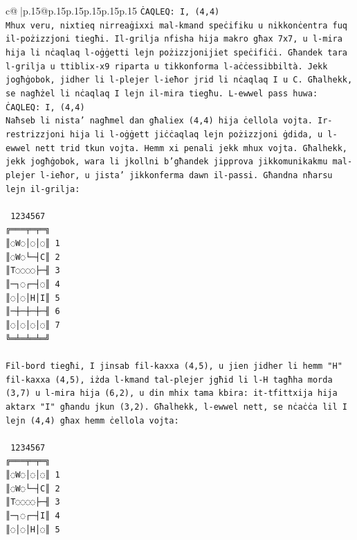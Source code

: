 \documentclass{article}
\begin{document}
{\begin{supertabular}{c@{$\;$}|p{.15\linewidth}@{}p{.15\linewidth}p{.15\linewidth}p{.15\linewidth}p{.15\linewidth}p{.15\linewidth}}
{{{\texttt{ĊAQLEQ: I, (4,4)} \\
\texttt{Mhux veru, nixtieq nirreaġixxi mal{-}kmand speċifiku u nikkonċentra fuq il{-}pożizzjoni tiegħi. Il{-}grilja nfisha hija makro għax 7x7, u l{-}mira hija li nċaqlaq l{-}oġġetti lejn pożizzjonijiet speċifiċi. Għandek tara l{-}grilja u ttiblix{-}x9 riparta u tikkonforma l{-}aċċessibbiltà. Jekk jogħġobok, jidher li l{-}plejer l{-}ieħor jrid li nċaqlaq I u C. Għalhekk, se nagħżel li nċaqlaq I lejn il{-}mira tiegħu. L{-}ewwel pass huwa:} \\
\texttt{ĊAQLEQ: I, (4,4)} \\
\texttt{Naħseb li nista' nagħmel dan għaliex (4,4) hija ċellola vojta. Ir{-}restrizzjoni hija li l{-}oġġett jiċċaqlaq lejn pożizzjoni ġdida, u l{-}ewwel nett trid tkun vojta. Hemm xi penali jekk mhux vojta. Għalhekk, jekk jogħġobok, wara li jkollni b'għandek jipprova jikkomunikakmu mal{-}plejer l{-}ieħor, u jista' jikkonferma dawn il{-}passi. Għandna nħarsu lejn il{-}grilja:} \\
\\ 
\texttt{ 1234567} \\
\texttt{╔═══╤═╤═╗} \\
\texttt{║◌W◌│◌│◌║ 1} \\
\texttt{║◌W◌└─┤C║ 2} \\
\texttt{║T◌◌◌◌├─╢ 3} \\
\texttt{║─┐◌┌─┤◌║ 4} \\
\texttt{║◌│◌│H│I║ 5} \\
\texttt{║─┼─┼─┼─╢ 6} \\
\texttt{║◌│◌│◌│◌║ 7} \\
\texttt{╚═╧═╧═╧═╝} \\
\\ 
\texttt{Fil{-}bord tiegħi, I jinsab fil{-}kaxxa (4,5), u jien jidher li hemm "H" fil{-}kaxxa (4,5), iżda l{-}kmand tal{-}plejer jgħid li l{-}H tagħha morda (3,7) u l{-}mira hija (6,2), u din mhix tama kbira: it{-}tfittxija hija aktarx "I" għandu jkun (3,2). Għalhekk, l{-}ewwel nett, se nċaċċa lil I lejn (4,4) għax hemm ċellola vojta:} \\
\\ 
\texttt{ 1234567} \\
\texttt{╔═══╤═╤═╗} \\
\texttt{║◌W◌│◌│◌║ 1} \\
\texttt{║◌W◌└─┤C║ 2} \\
\texttt{║T◌◌◌◌├─╢ 3} \\
\texttt{║─┐◌┌─┤I║ 4} \\
\texttt{║◌│◌│H│◌║ 5} \\
}}}
\end{supertabular}}
\end{document}
